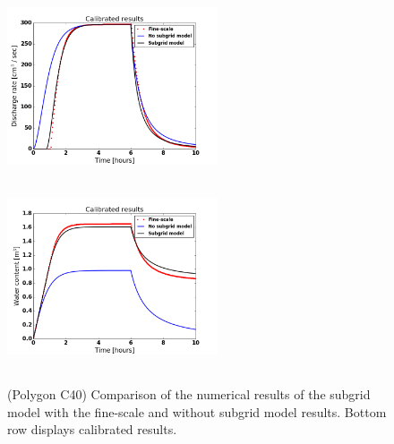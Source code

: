\documentclass[review,11pt]{elsarticle}
\begin{document}
\begin{figure}
\centering
\includegraphics[width=6.2cm, height=5.5cm]{./figures/POLYGON40/POLYGON40dischargeCalibManning.png}
\includegraphics[width=6.2cm, height=5.5cm]{./figures/POLYGON40/POLYGON40watercontentCalibManning.png}
\caption{(Polygon C40) Comparison of the numerical results of the subgrid model with the fine-scale and without subgrid model results. Bottom row displays calibrated results.}
\label{polygon-C40}
\end{figure}
\end{document}
